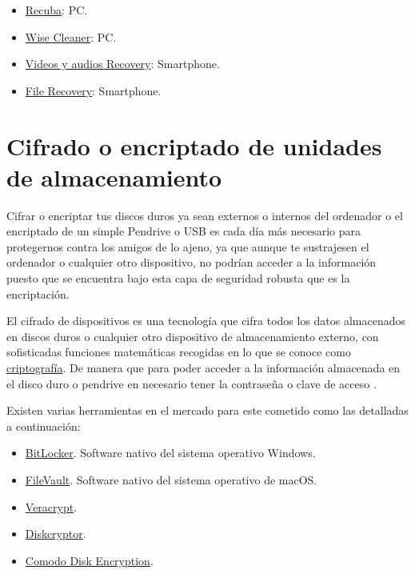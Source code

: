 \documentclass[
  spanish,
  a4paper,
  openany]{book}
\begin{document}
\begin{itemize}
\item
  \href{https://www.ccleaner.com/recuva}{Recuba}: PC.
\item
  \href{https://www.wisecleaner.com/wise-data-recovery.html}{Wise Cleaner}: PC.
\item
  \href{https://play.google.com/store/apps/details?id=com.mediarecovery.deletedvideorecovery.deletedaudiorecovery\&hl=es}{Videos y audios Recovery}: Smartphone.
\item
  \href{https://play.google.com/store/apps/details?id=com.file.recovery.data.recovery.deletedfilerecovery}{File Recovery}: Smartphone.
\end{itemize}

\hypertarget{cifrado-o-encriptado-de-unidades-de-almacenamiento}{%
\section{Cifrado o encriptado de unidades de almacenamiento}\label{cifrado-o-encriptado-de-unidades-de-almacenamiento}}

Cifrar o encriptar tus discos duros ya sean externos o internos del ordenador o el encriptado de un simple Pendrive o USB es cada día más necesario para protegernos contra los amigos de lo ajeno, ya que aunque te sustrajesen el ordenador o cualquier otro dispositivo, no podrían acceder a la información puesto que se encuentra bajo esta capa de seguridad robusta que es la encriptación.

El cifrado de dispositivos es una tecnología que cifra todos los datos almacenados en discos duros o cualquier otro dispositivo de almacenamiento externo, con sofisticadas funciones matemáticas recogidas en lo que se conoce como \href{https://es.wikipedia.org/wiki/Criptografía}{criptografía}. De manera que para poder acceder a la información almacenada en el disco duro o pendrive en necesario tener la contraseña o clave de acceso \citep{cifrado}.

Existen varias herramientas en el mercado para este cometido como las detalladas a continuación:

\begin{itemize}
\item
  \href{https://docs.microsoft.com/es-es/windows/security/information-protection/bitlocker/bitlocker-overview}{BitLocker}. Software nativo del sistema operativo Windows.
\item
  \href{https://support.apple.com/es-es/HT204837}{FileVault}. Software nativo del sistema operativo de macOS.
\item
  \href{https://www.veracrypt.fr}{Veracrypt}.
\item
  \href{https://diskcryptor.org/}{Diskcryptor}.
\item
  \href{https://www.comodo.com/home/internet-security/disk-encryption.php}{Comodo Disk Encryption}.
\end{itemize}
\end{document}
